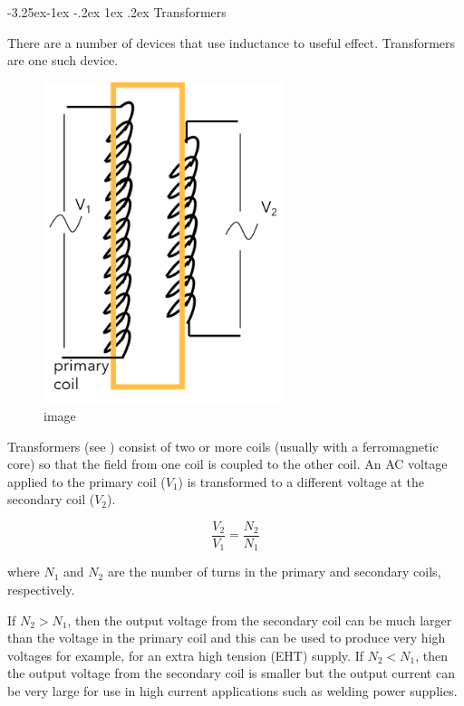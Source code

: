 \documentclass[
]{book}
\makeatletter
\renewcommand\subsection{%
\@startsection{subsection}{2}{\z@}%
              {-3.25ex\@plus -1ex \@minus -.2ex}%
              {1ex \@plus .2ex}%
              {\sffamily\bfseries}}
\numberwithin{equation}{section}
\makeatother
\begin{document}
\hypertarget{transformers}{%
\subsection{Transformers}\label{transformers}}

There are a number of devices that use inductance to useful effect.
Transformers are one such device.

\begin{figure}
\centering
\includegraphics[width=70mm,height=\textheight]{Figures/transformers.png}
\caption{image}
\end{figure}

Transformers (see ) consist of two or more coils (usually with a
ferromagnetic core) so that the field from one coil is coupled to the
other coil. An AC voltage applied to the primary coil (\(V_1\)) is
transformed to a different voltage at the secondary coil (\(V_2\)).

\begin{equation}
\label{eq:transformer}
\frac{V_2}{V_1} = \frac{N_2}{N_1}
\end{equation}

where \(N_1\) and \(N_2\) are the number of turns in the primary and
secondary coils, respectively.

If \(N_2 > N_1\), then the output voltage from the secondary coil can be
much larger than the voltage in the primary coil and this can be used to
produce very high voltages for example, for an extra high tension (EHT)
supply. If \(N_2 < N_1\), then the output voltage from the secondary coil
is smaller but the output current can be very large for use in high
current applications such as welding power supplies.
\end{document}
